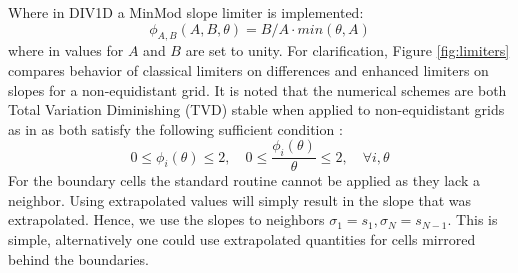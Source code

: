 \documentclass[amsmath,amssymb,a4]{revtex4-2}
\begin{document}
Where in DIV1D a MinMod slope limiter is implemented:
\begin{equation}
    \phi_{A,B}(A,B,\theta) = B/A \cdot min(\theta, A)
\end{equation}
where in \cite{derks2022} values for $A$ and $B$ are set to unity. For clarification, Figure \ref{fig:limiters} compares behavior of classical limiters on differences and enhanced limiters on slopes for a non-equidistant grid.  It is noted that the numerical schemes are both Total Variation Diminishing (TVD) stable when applied to non-equidistant grids as in \cite{dudson2019,derks2022} as both satisfy the following sufficient condition \cite{zeng2013,harten1997}: 
\begin{equation} \label{eq:TVD_stable}
0 \leq \phi_i(\theta) \leq 2, \quad 0 \leq \frac{\phi_i(\theta)}{\theta} \leq 2, \quad \forall i, \theta
\end{equation}
For the boundary cells the standard routine cannot be applied as they lack a neighbor. Using extrapolated values will simply result in the slope that was extrapolated. Hence, we use the slopes to neighbors $\sigma_1 = s_1, \sigma_N = s_{N-1}$. This is simple, alternatively one could use extrapolated quantities for cells mirrored behind the boundaries. 
\end{document}
